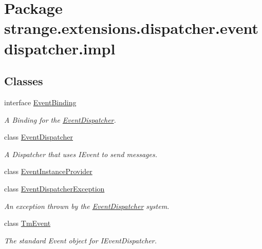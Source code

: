 \hypertarget{namespacestrange_1_1extensions_1_1dispatcher_1_1eventdispatcher_1_1impl}{\section{Package strange.\-extensions.\-dispatcher.\-eventdispatcher.\-impl}
\label{namespacestrange_1_1extensions_1_1dispatcher_1_1eventdispatcher_1_1impl}
}
\subsection*{Classes}
\begin{DoxyCompactItemize}
\item 
interface \hyperlink{classstrange_1_1extensions_1_1dispatcher_1_1eventdispatcher_1_1impl_1_1_event_binding}{Event\-Binding}
\begin{DoxyCompactList}\small\item\em A Binding for the \hyperlink{classstrange_1_1extensions_1_1dispatcher_1_1eventdispatcher_1_1impl_1_1_event_dispatcher}{Event\-Dispatcher}. \end{DoxyCompactList}\item 
class \hyperlink{classstrange_1_1extensions_1_1dispatcher_1_1eventdispatcher_1_1impl_1_1_event_dispatcher}{Event\-Dispatcher}
\begin{DoxyCompactList}\small\item\em A Dispatcher that uses I\-Event to send messages. \end{DoxyCompactList}\item 
class \hyperlink{classstrange_1_1extensions_1_1dispatcher_1_1eventdispatcher_1_1impl_1_1_event_instance_provider}{Event\-Instance\-Provider}
\item 
class \hyperlink{classstrange_1_1extensions_1_1dispatcher_1_1eventdispatcher_1_1impl_1_1_event_dispatcher_exception}{Event\-Dispatcher\-Exception}
\begin{DoxyCompactList}\small\item\em An exception thrown by the \hyperlink{classstrange_1_1extensions_1_1dispatcher_1_1eventdispatcher_1_1impl_1_1_event_dispatcher}{Event\-Dispatcher} system. \end{DoxyCompactList}\item 
class \hyperlink{classstrange_1_1extensions_1_1dispatcher_1_1eventdispatcher_1_1impl_1_1_tm_event}{Tm\-Event}
\begin{DoxyCompactList}\small\item\em The standard Event object for I\-Event\-Dispatcher. \end{DoxyCompactList}\end{DoxyCompactItemize}
